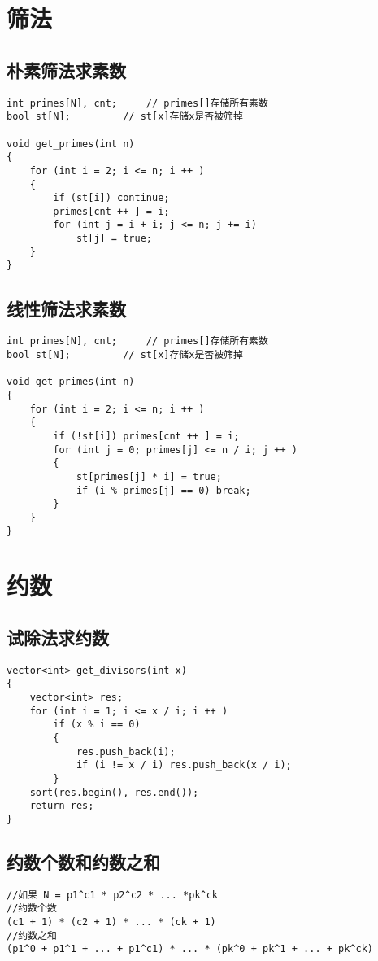 \documentclass[12pt,a4paper,UTF16]{ctexbook}
\theoremstyle{plain}
\begin{document}
\section{筛法}
\subsection{朴素筛法求素数}
\begin{lstlisting}
int primes[N], cnt;     // primes[]存储所有素数
bool st[N];         // st[x]存储x是否被筛掉

void get_primes(int n)
{
    for (int i = 2; i <= n; i ++ )
    {
        if (st[i]) continue;
        primes[cnt ++ ] = i;
        for (int j = i + i; j <= n; j += i)
            st[j] = true;
    }
}
\end{lstlisting}
\subsection{线性筛法求素数}
\begin{lstlisting}
int primes[N], cnt;     // primes[]存储所有素数
bool st[N];         // st[x]存储x是否被筛掉

void get_primes(int n)
{
    for (int i = 2; i <= n; i ++ )
    {
        if (!st[i]) primes[cnt ++ ] = i;
        for (int j = 0; primes[j] <= n / i; j ++ )
        {
            st[primes[j] * i] = true;
            if (i % primes[j] == 0) break;
        }
    }
}
\end{lstlisting}

\section{约数}
\subsection{试除法求约数}
\begin{lstlisting}
vector<int> get_divisors(int x)
{
    vector<int> res;
    for (int i = 1; i <= x / i; i ++ )
        if (x % i == 0)
        {
            res.push_back(i);
            if (i != x / i) res.push_back(x / i);
        }
    sort(res.begin(), res.end());
    return res;
}
\end{lstlisting}
\subsection{约数个数和约数之和}
\begin{lstlisting}
//如果 N = p1^c1 * p2^c2 * ... *pk^ck
//约数个数
(c1 + 1) * (c2 + 1) * ... * (ck + 1)
//约数之和
(p1^0 + p1^1 + ... + p1^c1) * ... * (pk^0 + pk^1 + ... + pk^ck)
\end{lstlisting}
\end{document}
